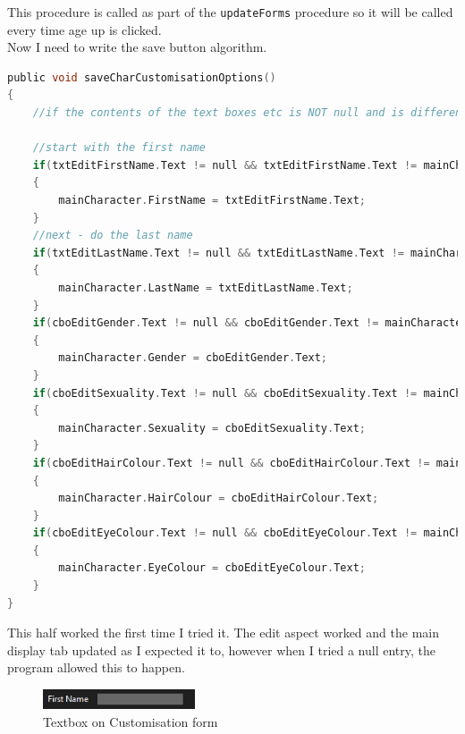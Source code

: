 This procedure is called as part of the \verb|updateForms| procedure so it will be called every time age up is clicked.\\
Now I need to write the save button algorithm.
\begin{lstlisting}[language=c, style=csharp, caption=Save character customisation procedure]
public void saveCharCustomisationOptions()
{
    //if the contents of the text boxes etc is NOT null and is different to the current contents of the main character object, then it needs to be written into the object

    //start with the first name
    if(txtEditFirstName.Text != null && txtEditFirstName.Text != mainCharacter.FirstName)
    {
        mainCharacter.FirstName = txtEditFirstName.Text;
    }
    //next - do the last name
    if(txtEditLastName.Text != null && txtEditLastName.Text != mainCharacter.LastName)
    {
        mainCharacter.LastName = txtEditLastName.Text;
    }
    if(cboEditGender.Text != null && cboEditGender.Text != mainCharacter.Gender)
    {
        mainCharacter.Gender = cboEditGender.Text;
    }
    if(cboEditSexuality.Text != null && cboEditSexuality.Text != mainCharacter.Sexuality)
    {
        mainCharacter.Sexuality = cboEditSexuality.Text;
    }
    if(cboEditHairColour.Text != null && cboEditHairColour.Text != mainCharacter.HairColour)
    {
        mainCharacter.HairColour = cboEditHairColour.Text;
    }
    if(cboEditEyeColour.Text != null && cboEditEyeColour.Text != mainCharacter.EyeColour)
    {
        mainCharacter.EyeColour = cboEditEyeColour.Text;
    }
}
\end{lstlisting}
This half worked the first time I tried it. The edit aspect worked and the main display tab updated as I expected it to, however when I tried a null entry, the program allowed this to happen.
\begin{figure}[H]
    \centering
    \includegraphics[width=0.4\textwidth]{images/implementation/customise2.png}
    \caption{Textbox on Customisation form}
    \label{fig:implementation-customise2}
\end{figure}

